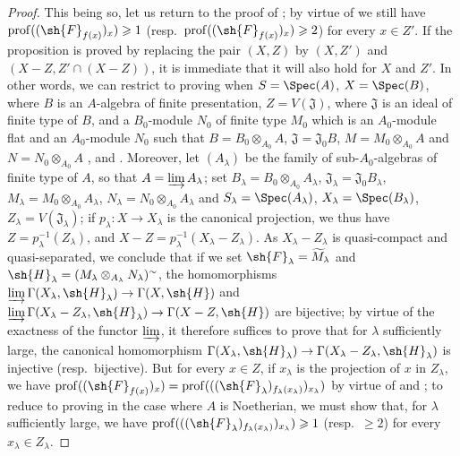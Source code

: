\begin{proof}
This being so, let us return to the proof of ; by virtue of  we still have $\operatorname{prof}((\sh{F}_{f(x)})_x)\geqslant 1$ (resp.\ $\operatorname{prof}((\sh{F}_{f(x)})_x)\geqslant 2$) for every $x\in Z'$.
If the proposition is proved by replacing the pair $(X,Z)$ by $(X,Z')$ and $(X-Z,Z'\cap(X-Z))$, it is immediate that it will also hold for $X$ and $Z'$.
In other words, we can restrict to proving  when $S=\Spec(A)$, $X=\Spec(B)$, where $B$ is an $A$-algebra of finite presentation, $Z=V(\mathfrak{J})$, where $\mathfrak{J}$ is an ideal of finite type of $B$,
and a $B_0$-module $N_0$ of finite type $M_0$ which is an $A_0$-module flat and an $A_0$-module $N_0$ such that $B=B_0\otimes_{A_0}A$, $\mathfrak{J}=\mathfrak{J}_0 B$, $M=M_0\otimes_{A_0}A$ and $N=N_0\otimes_{A_0}A$ ,  and .
Moreover, let $(A_\lambda)$ be the family of sub-$A_0$-algebras of finite type of $A$, so that $A=\varinjlim A_\lambda$; set $B_\lambda=B_0\otimes_{A_0}A_\lambda$, $\mathfrak{J}_\lambda=\mathfrak{J}_0 B_\lambda$, $M_\lambda=M_0\otimes_{A_0}A_\lambda$, $N_\lambda=N_0\otimes_{A_0}A_\lambda$ and $S_\lambda=\Spec(A_\lambda)$, $X_\lambda=\Spec(B_\lambda)$, $Z_\lambda=V(\mathfrak{J}_\lambda)$; if $p_\lambda:X\to X_\lambda$ is the canonical projection, we thus have $Z=p_\lambda^{-1}(Z_\lambda)$, and $X-Z=p_\lambda^{-1}(X_\lambda-Z_\lambda)$.
As $X_\lambda-Z_\lambda$ is quasi-compact and quasi-separated, we conclude  that if we set $\sh{F}_\lambda=\widetilde{M}_\lambda$ and $\sh{H}_\lambda=(M_\lambda\otimes_{A_\lambda}N_\lambda)^\sim$, the homomorphisms $\varinjlim\Gamma(X_\lambda,\sh{H}_\lambda)\to\Gamma(X,\sh{H})$ and $\varinjlim\Gamma(X_\lambda-Z_\lambda,\sh{H}_\lambda)\to\Gamma(X-Z,\sh{H})$ are bijective; by virtue of the exactness of the functor $\varinjlim$, it therefore suffices to prove that for $\lambda$ sufficiently large, the canonical homomorphism $\Gamma(X_\lambda,\sh{H}_\lambda)\to\Gamma(X_\lambda-Z_\lambda,\sh{H}_\lambda)$ is injective (resp.\ bijective).
But for every $x\in Z$, if $x_\lambda$ is the projection of $x$ in $Z_\lambda$, we have $\operatorname{prof}((\sh{F}_{f(x)})_x)=\operatorname{prof}(((\sh{F}_\lambda)_{f_\lambda(x_\lambda)})_{x_\lambda})$ by virtue of  and ; to reduce to proving  in the case where $A$ is Noetherian, we must show that, for $\lambda$ sufficiently large, we have $\operatorname{prof}(((\sh{F}_\lambda)_{f_\lambda(x_\lambda)})_{x_\lambda})\geqslant 1$ (resp.\ $\geqslant 2$) for every $x_\lambda\in Z_\lambda$.

\end{proof}
